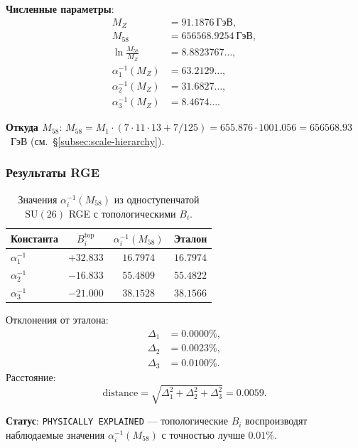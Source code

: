 \documentclass[11pt,a4paper]{article}
\newcommand{\SU}{\ensuremath{\mathrm{SU}}}
\theoremstyle{definition}
\begin{document}
\medskip\noindent
\textbf{Численные параметры}:
\begin{align}
    M_Z &= 91.1876~\text{ГэВ}, \\
    M_{58} &= 656568.9254~\text{ГэВ}, \\
    \ln\frac{M_{58}}{M_Z} &= 8.8823767\ldots, \\
    \alpha_1^{-1}(M_Z) &= 63.2129\ldots, \\
    \alpha_2^{-1}(M_Z) &= 31.6827\ldots, \\
    \alpha_3^{-1}(M_Z) &= 8.4674\ldots.
\end{align}

\medskip\noindent
\textbf{Откуда $M_{58}$}: $M_{58} = M_1 \cdot (7 \cdot 11 \cdot 13
+ 7/125) = 655.876 \cdot 1001.056 = 656568.93$~ГэВ
(см.~\S\ref{subsec:scale-hierarchy}).

\subsubsection{Результаты RGE}

\begin{table}[ht]
\centering
\caption{Значения \texorpdfstring{$\alpha_i^{-1}(M_{58})$}{\_i^-1(M\_58)} из одноступенчатой
\texorpdfstring{$\SU(26)$}{(26)} RGE с топологическими \texorpdfstring{$B_i$}{B\_i}.}
\label{tab:alpha-values-bi}
\begin{tabular}{lccc}
\toprule
Константа & $B_i^{\text{top}}$ & $\alpha_i^{-1}(M_{58})$ & Эталон \\
\midrule
$\alpha_1^{-1}$ & $+32.833$ & $16.7974$ & $16.7974$ \\
$\alpha_2^{-1}$ & $-16.833$ & $55.4809$ & $55.4822$ \\
$\alpha_3^{-1}$ & $-21.000$ & $38.1528$ & $38.1566$ \\
\bottomrule
\end{tabular}
\end{table}

\medskip\noindent
Отклонения от эталона:
\begin{align}
    \Delta_1 &= 0.0000\%, \\
    \Delta_2 &= 0.0023\%, \\
    \Delta_3 &= 0.0100\%.
\end{align}
Расстояние:
\begin{equation}
    \text{distance} = \sqrt{\Delta_1^2 + \Delta_2^2 + \Delta_3^2}
    = 0.0059.
\end{equation}

\medskip\noindent
\textbf{Статус}: \texttt{PHYSICALLY EXPLAINED} --- топологические
$B_i$ воспроизводят наблюдаемые значения $\alpha_i^{-1}(M_{58})$
с точностью лучше $0.01\%$.
\end{document}
